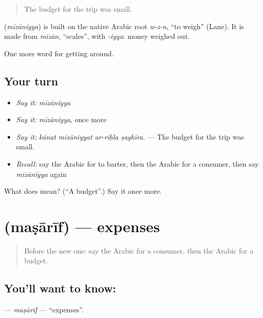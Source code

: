 \begin{quote}
The budget for the trip was small.
\end{quote}

\begin{cousinweb}
\textbf{} (\emph{mīzāniyya}) is built on the native Arabic root \emph{w-z-n}, \textquotedblleft{}to weigh\textquotedblright{} (Lane). It is made from \emph{mīzān}, \textquotedblleft{}scales\textquotedblright{}, with \emph{-iyya}: money weighed out.
\end{cousinweb}

\begin{grammarlens}[title={What you've built}]
One more word for getting around.
\end{grammarlens}

\subsection*{Your turn}
\begin{itemize}
\raggedright
  \item \emph{Say it:} \emph{mīzāniyya}
  \item \emph{Say it:} \emph{mīzāniyya}, once more
  \item \emph{Say it:} \emph{kānat mīzāniyyat ar-riḥla ṣaghīra.} — The budget for the trip was small.
  \item \emph{Recall:} say the Arabic for to barter, then the Arabic for a consumer, then say \emph{mīzāniyya} again
\end{itemize}

\begin{tcolorbox}[breakable,colback=teal!4,colframe=teal!35!black,title={Before you move on}]
What does  mean? (\textquotedblleft{}A budget\textquotedblright{}.) Say it once more.
\end{tcolorbox}
\section[\texorpdfstring{\ar{مصاريف} (maṣārīf)}{مصاريف (maṣārīf)}]{ (maṣārīf) — expenses}

\label{lesson:AR-C459-masarif}



\begin{quote}
Before the new one: say the Arabic for a consumer, then the Arabic for a budget.
\end{quote}

\subsection*{You'll want to know: }
\textbf{} — \emph{maṣārīf} — \textquotedblleft{}expenses\textquotedblright{}.

